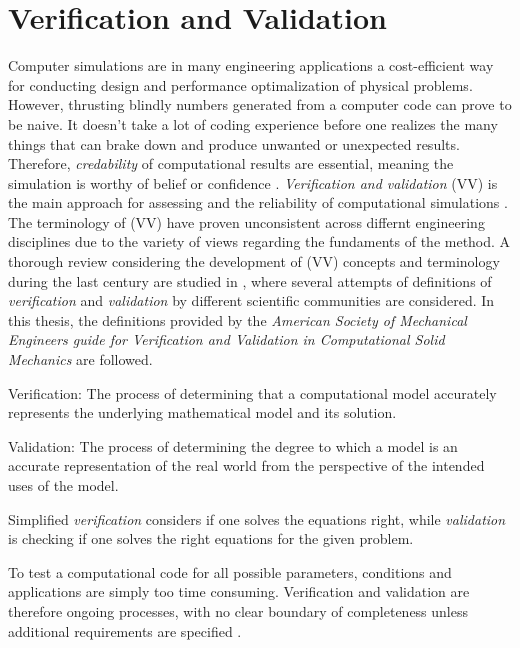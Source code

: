 \chapter{Verification and Validation}
 Computer simulations are in many engineering applications a cost-efficient way for conducting design and performance optimalization of physical problems. However, thrusting blindly numbers generated from a computer code can prove to be naive. It doesn't take a lot of coding experience before one realizes the many things that can brake down and produce unwanted or unexpected results. 
Therefore, \textit{credability} of computational results are essential, meaning the simulation is worthy of belief or confidence \cite{Oberkampf2010}.
 \textit{Verification and validation} (VV) is the main approach for assessing and the reliability of computational simulations \cite{Sommerville2006}. The terminology of (VV) have proven unconsistent across differnt engineering disciplines due to the variety of views regarding the fundaments of the method. A thorough review considering the development of (VV) concepts and terminology during the last century are studied in \cite{Oberkampf2010}, where several attempts of definitions of \textit{verification} and \textit{validation} by different scientific communities are considered. In this thesis, the definitions provided by the \textit{American Society of Mechanical Engineers guide for Verification and Validation in Computational Solid Mechanics}  \cite{Schwer2006} are followed.

\begin{defn}
Verification: The process of determining that a computational model accurately represents
the underlying mathematical model and its solution. 
\end{defn}

\begin{defn}
Validation: The process of determining the degree to which a model is an accurate
representation of the real world from the perspective of the intended uses of the model. 
\end{defn}

Simplified \textit{verification} considers if one solves the equations right, while \textit{validation} is checking if one solves the right equations for the given problem. \cite{Roache} 

 To test a computational code for all possible parameters, conditions and applications are simply too time consuming.   Verification and validation are therefore ongoing processes, with no clear boundary of completeness unless additional requirements are specified \cite{Roache}.


